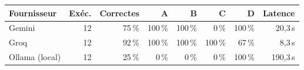 \begin{tabular}{lrrrrrrr}
\toprule
\textbf{Fournisseur} & \textbf{Exéc.} & \textbf{Correctes} & \textbf{A} & \textbf{B} & \textbf{C} & \textbf{D} & \textbf{Latence} \\
\midrule
Gemini & 12 & 75\,\% & 100\,\% & 100\,\% & 0\,\% & 100\,\% & 20,3\,s \\
Groq & 12 & 92\,\% & 100\,\% & 100\,\% & 100\,\% & 67\,\% & 8,3\,s \\
Ollama (local) & 12 & 25\,\% & 0\,\% & 0\,\% & 0\,\% & 100\,\% & 190,3\,s \\
\bottomrule
\end{tabular}
